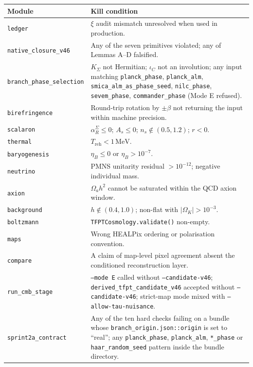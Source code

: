 \begin{center}
\renewcommand{\arraystretch}{1.05}
\begin{tabularx}{\textwidth}{@{}p{}Y@{}}
\toprule
\textbf{Module} & \textbf{Kill condition} \\
\midrule
\texttt{ledger}        & \(\xi\) audit mismatch unresolved when used in production. \\
\texttt{native\_closure\_v46} & Any of the seven primitives violated; any of Lemmas A--D falsified. \\
\texttt{branch\_phase\_selection} & \(K_\Sigma\) not Hermitian; \(\iota_C\) not an involution; any input matching \texttt{planck\_phase}, \texttt{planck\_alm}, \texttt{smica\_alm\_as\_phase\_seed}, \texttt{nilc\_phase}, \texttt{sevem\_phase}, \texttt{commander\_phase} (Mode E refused). \\
\texttt{birefringence} & Round-trip rotation by \(\pm\beta\) not returning the input within machine precision. \\
\texttt{scalaron}      & \(\alpha_R^\Sigma\le 0\); \(A_s\le 0\); \(n_s\notin(0.5,1.2)\); \(r<0\). \\
\texttt{thermal}       & \(T_{\mathrm{reh}}<1\,\mathrm{MeV}\). \\
\texttt{baryogenesis}  & \(\eta_B\le 0\) or \(\eta_B>10^{-7}\). \\
\texttt{neutrino}      & PMNS unitarity residual \(>10^{-12}\); negative individual mass. \\
\texttt{axion}         & \(\Omega_a h^2\) cannot be saturated within the QCD axion window. \\
\texttt{background}    & \(h\notin(0.4,1.0)\); non-flat with \(|\Omega_K|>10^{-3}\). \\
\texttt{boltzmann}     & \texttt{TFPTCosmology.validate()} non-empty. \\
\texttt{maps}          & Wrong HEALPix ordering or polarisation convention. \\
\texttt{compare}       & A claim of map-level pixel agreement absent the conditioned reconstruction layer. \\
\texttt{run\_cmb\_stage} & \texttt{--mode E} called without \texttt{--candidate-v46}; \texttt{derived\_tfpt\_candidate\_v46} accepted without \texttt{--candidate-v46}; strict-map mode mixed with \texttt{--allow-tau-nuisance}. \\
\texttt{sprint2a\_contract} & Any of the ten hard checks failing on a bundle whose \texttt{branch\_origin.json::origin} is set to ``real''; any \texttt{planck\_phase}, \texttt{planck\_alm}, \texttt{*\_phase} or \texttt{haar\_random\_seed} pattern inside the bundle directory. \\
\bottomrule
\end{tabularx}
\end{center}

